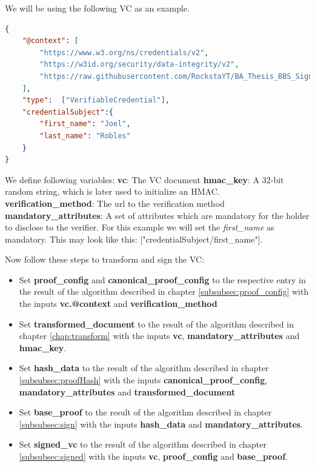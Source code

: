 \documentclass[
	a4paper               %
	,bibliography=totoc   %
	,listof=totoc         %
	,monolingual
	twoside=false,
]{bfhthesis}              %
\begin{document}
We will be using the following VC as an example.
\begin{lstlisting}[language=json,firstnumber=1,caption={Example VC},captionpos=b]
{
	"@context": [
		"https://www.w3.org/ns/credentials/v2",
		"https://w3id.org/security/data-integrity/v2",
		"https://raw.githubusercontent.com/RockstaYT/BA_Thesis_BBS_Signatures/docs/context/example_1.jsonld"
	],
	"type":  ["VerifiableCredential"],
	"credentialSubject":{
		"first_name": "Joel",
		"last_name": "Robles"
	}
}
\end{lstlisting}

We define following variables:\newline
\textbf{vc}: The VC document\newline
\textbf{hmac\_key}: A 32-bit random string, which is later used to initialize an HMAC.\newline
\textbf{verification\_method}: The url to the verification method\\
\textbf{mandatory\_attributes}: A set of attributes which are mandatory for the holder to disclose to the verifier. For this example we will set the \textit{first\_name} as mandatory. This may look like this: ["credentialSubject/first\_name"].\newline

Now follow these steps to transform and sign the VC:
\begin{itemize}
	\item Set \textbf{proof\_config} and \textbf{canonical\_proof\_config} to the respective entry in the result of the algorithm described in chapter \ref{subsubsec:proof_config} with the inputs \textbf{vc.@context} and \textbf{verification\_method}
	\item Set \textbf{transformed\_document} to the result of the algorithm described in chapter \ref{chap:transform} with the inputs \textbf{vc}, \textbf{mandatory\_attributes} and \textbf{hmac\_key}.
	\item Set \textbf{hash\_data} to the result of the algorithm described in chapter \ref{subsubsec:proofHash} with the inputs \textbf{canonical\_proof\_config}, \textbf{mandatory\_attributes} and \textbf{transformed\_document}
	\item Set \textbf{base\_proof} to the result of the algorithm described in chapter \ref{subsubsec:sign} with the inputs \textbf{hash\_data} and \textbf{mandatory\_attributes}.
	\item Set \textbf{signed\_vc} to the result of the algorithm described in chapter \ref{subsubsec:signed} with the inputs \textbf{vc}, \textbf{proof\_config} and \textbf{base\_proof}.
\end{itemize}
\end{document}
